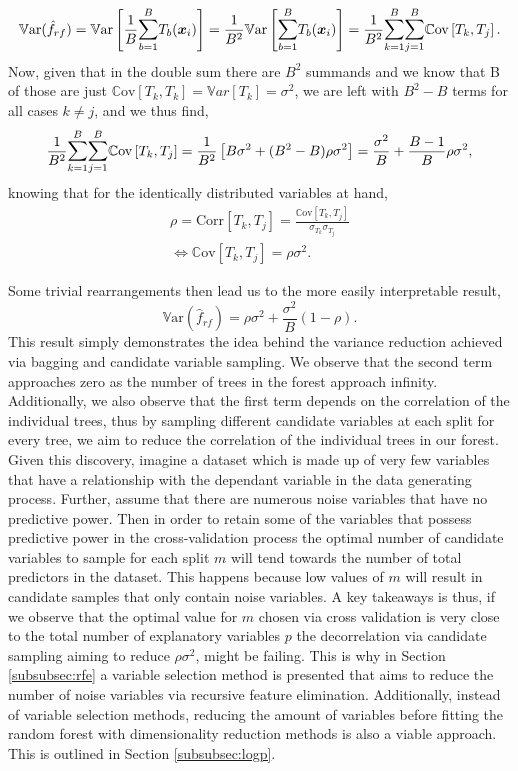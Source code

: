\documentclass[a4paper,12pt, headsepline]{scrartcl}
\numberwithin{equation}{section}
\begin{document}
 \[
 \mathbb{V}\text{ar}(\hat f_{rf}) = \mathbb{V}\text{ar} \left[ \frac{1}{B} \mathlarger{\sum}\limits_{b = 1}^B T_b(\bm x_i) \right] = \frac{1}{B^2} \mathbb{V}\text{ar} \left[ \mathlarger{\sum}\limits_{b = 1}^B T_b(\bm x_i) \right] = \frac{1}{B^2} \mathlarger{\sum}\limits_{k = 1}^B \mathlarger{\sum}\limits_{j = 1}^B \mathbb{C}\text{ov} \left[T_k, T_j \right].
 \]
Now, given that in the double sum there are $B^2$ summands and we know that B of those are just $\mathbb{C}\text{ov}\left[T_k, T_k \right] = \mathbb{V}ar\left[T_k\right] = \sigma^2$, we are left with $B^2 - B$ terms for all cases $k \neq j$, and we thus find,
\[
\frac{1}{B^2} \mathlarger{\sum}\limits_{k = 1}^B \mathlarger{\sum}\limits_{j = 1}^B \mathbb{C}\text{ov} \left[T_k, T_j \right] = \frac{1}{B^2} \left[B\sigma^2 + (B^2 - B)\rho\sigma^2 \right] = \frac{\sigma^2}{B} +  \frac{B - 1}{B}\rho\sigma^2,
\]
knowing that for the identically distributed variables at hand,
\begin{gather*}
	\rho = \text{Corr}\left[T_k, T_j\right] =  \frac{\mathbb{C}\text{ov}\left[T_k, T_j \right]}{\sigma_{T_k}\sigma_{T_j}}\\
	\iff \mathbb{C}\text{ov}\left[T_k, T_j \right] = \rho\sigma^2.
\end{gather*}

Some trivial rearrangements then lead us to the more easily interpretable result,
\[
\mathbb{V}\text{ar}(\hat f_{rf}) = \rho\sigma^2 + \frac{\sigma^2}{B}(1 - \rho).
\]
This result simply demonstrates the idea behind the variance reduction achieved via bagging and candidate variable sampling. We observe that the second term approaches zero as the number of trees in the forest approach infinity. Additionally, we also observe that the first term depends on the correlation of the individual trees, thus by sampling different candidate variables at each split for every tree, we aim to reduce the correlation of the individual trees in our forest.\\
Given this discovery, imagine a dataset which is made up of very few variables that have a relationship with the dependant variable in the data generating process. Further, assume that there are numerous noise variables that have no predictive power. Then in order to retain some of the variables that possess predictive power in the cross-validation process the optimal number of candidate variables to sample for each split $m$ will tend towards the number of total predictors in the dataset. This happens because low values of $m$ will result in candidate samples that only contain noise variables. A key takeaways is thus, if we observe that the optimal value for $m$ chosen via cross validation is very close to the total number of explanatory variables $p$ the decorrelation via candidate sampling aiming to reduce $\rho\sigma^2$, might be failing. This is why in Section \ref{subsubsec:rfe} a variable selection method is presented that aims to reduce the number of noise variables via recursive feature elimination. Additionally, instead of variable selection methods, reducing the amount of variables before fitting the random forest with dimensionality reduction methods is also a viable approach. This is outlined in Section \ref{subsubsec:logp}.
\end{document}
